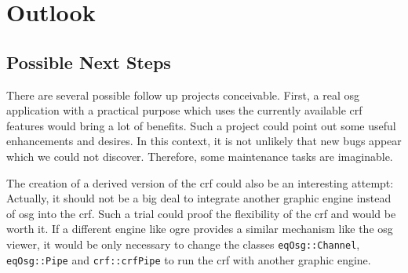 \chapter{Outlook}

\section{Possible Next Steps}
There are several possible follow up projects conceivable. First, a real \gls{osg} application with a practical purpose which uses the currently available \gls{crf} features would bring a lot of benefits. Such a project could point out some useful enhancements and desires. In this context, it is not unlikely that new bugs appear which we could not discover. Therefore, some maintenance tasks are imaginable.

The creation of a derived version of the \gls{crf} could also be an interesting attempt: Actually, it should not be a big deal to integrate another graphic engine instead of \gls{osg} into the \gls{crf}. Such a trial could proof the flexibility of the \gls{crf} and would be worth it. If a different engine like \gls{ogre} provides a similar mechanism like the \gls{osg} viewer, it would be only necessary to change the classes \texttt{eqOsg::Channel}, \texttt{eqOsg::Pipe} and \texttt{crf::crfPipe} to run the \gls{crf} with another graphic engine.
